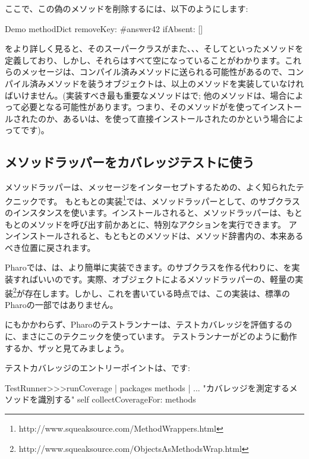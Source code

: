 \documentclass[a4paper,10pt,twoside]{book}
\begin{document}
ここで、この偽のメソッドを削除するには、以下のようにします:
\begin{code}{}
Demo methodDict removeKey: #answer42 ifAbsent: []
\end{code}

をより詳しく見ると、そのスーパークラスがまた、、、そしてといったメソッドを定義しており、しかし、それらはすべて空になっていることがわかります。これらのメッセージは、コンパイル済みメソッドに送られる可能性があるので、コンパイル済みメソッドを装うオブジェクトは、以上のメソッドを実装していなければいけません。(実装すべき最も重要なメソッドはで; 他のメソッドは、場合によって必要となる可能性があります。つまり、そのメソッドがを使ってインストールされたのか、あるいは、を使って直接インストールされたのかという場合によってです)。

\subsection{メソッドラッパーをカバレッジテストに使う}

メソッドラッパーは、メッセージをインターセプトするための、よく知られたテクニックです\cite{Bran98a}。
もともとの実装\footnote{http://www.squeaksource.com/MethodWrappers.html}では、メソッドラッパーとして、のサブクラスのインスタンスを使います。インストールされると、メソッドラッパーは、もともとのメソッドを呼び出す前かあとに、特別なアクションを実行できます。
アンインストールされると、もともとのメソッドは、メソッド辞書内の、本来あるべき位置に戻されます。

Pharoでは、は、より簡単に実装できます。のサブクラスを作る代わりに、を実装すればいいのです。実際、オブジェクトによるメソッドラッパーの、軽量の実装\footnote{http://www.squeaksource.com/ObjectsAsMethodsWrap.html}が存在します。しかし、これを書いている時点では、この実装は、標準のPharoの一部ではありません。

にもかかわらず、Pharoのテストランナーは、テストカバレッジを評価するのに、まさにこのテクニックを使っています。
テストランナーがどのように動作するか、ザッと見てみましょう。

テストカバレッジのエントリーポイントは、です:
\begin{code}{}
TestRunner>>>runCoverage
	| packages methods |
	... "カバレッジを測定するメソッドを識別する"
	self collectCoverageFor: methods
\end{code}
\end{document}
